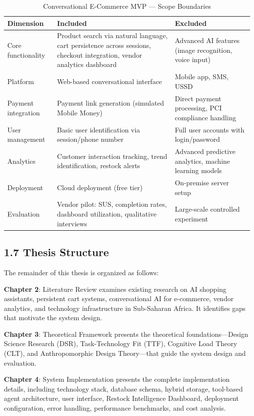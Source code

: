 \documentclass[12pt,a4paper]{article}
\begin{document}
\begin{table}[h]
\centering
\caption{Conversational E-Commerce MVP --- Scope Boundaries}
\label{tab:scope}
\begin{tabular}{p{4cm}p{5cm}p{5cm}}
\toprule
\textbf{Dimension} & \textbf{Included} & \textbf{Excluded} \\
\midrule
Core functionality & Product search via natural language, cart persistence across sessions, checkout integration, vendor analytics dashboard & Advanced AI features (image recognition, voice input) \\
Platform & Web-based conversational interface & Mobile app, SMS, USSD \\
Payment integration & Payment link generation (simulated Mobile Money) & Direct payment processing, PCI compliance handling \\
User management & Basic user identification via session/phone number & Full user accounts with login/password \\
Analytics & Customer interaction tracking, trend identification, restock alerts & Advanced predictive analytics, machine learning models \\
Deployment & Cloud deployment (free tier) & On-premise server setup \\
Evaluation & Vendor pilot: SUS, completion rates, dashboard utilization, qualitative interviews & Large-scale controlled experiment \\
\bottomrule
\end{tabular}
\end{table}

\subsection{1.7 Thesis Structure}

The remainder of this thesis is organized as follows:

\textbf{Chapter 2}: Literature Review examines existing research on AI shopping assistants, persistent cart systems, conversational AI for e-commerce, vendor analytics, and technology infrastructure in Sub-Saharan Africa. It identifies gaps that motivate the system design.

\textbf{Chapter 3}: Theoretical Framework presents the theoretical foundations---Design Science Research (DSR), Task-Technology Fit (TTF), Cognitive Load Theory (CLT), and Anthropomorphic Design Theory---that guide the system design and evaluation.

\textbf{Chapter 4}: System Implementation presents the complete implementation details, including technology stack, database schema, hybrid storage, tool-based agent architecture, user interface, Restock Intelligence Dashboard, deployment configuration, error handling, performance benchmarks, and cost analysis.
\end{document}
